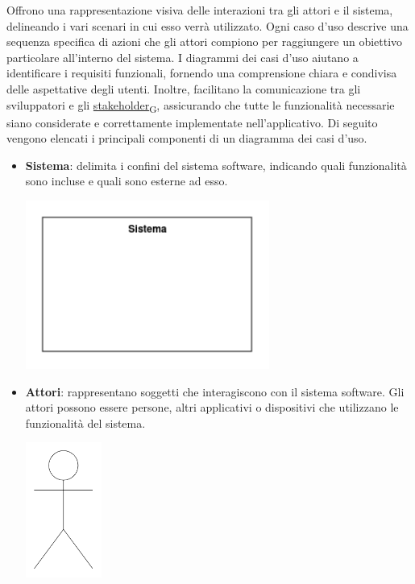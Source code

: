 Offrono una rappresentazione visiva delle interazioni tra gli attori e il sistema, delineando i vari scenari in cui esso verrà utilizzato. Ogni caso d'uso descrive una sequenza specifica di azioni che gli attori compiono per raggiungere un obiettivo particolare all'interno del sistema. I diagrammi dei casi d'uso aiutano a identificare i requisiti funzionali, fornendo una comprensione chiara e condivisa delle aspettative degli utenti. Inoltre, facilitano la comunicazione tra gli sviluppatori e gli \href{https://7last.github.io/docs/rtb/documentazione-interna/glossario\#stakeholder}{stakeholder\textsubscript{G}}, assicurando che tutte le funzionalità necessarie siano considerate e correttamente implementate nell'applicativo.
Di seguito vengono elencati i principali componenti di un diagramma dei casi d'uso.
\begin{itemize}
	\item \textbf{Sistema}: delimita i confini del sistema software, indicando quali funzionalità sono incluse e quali sono esterne ad esso.
	      \begin{center}
		      \includegraphics*[width=8cm]{../../../images/norme_di_progetto/sistema.png}
	      \end{center}
	\item \textbf{Attori}: rappresentano soggetti che interagiscono con il sistema software. Gli attori possono essere persone, altri applicativi o dispositivi che utilizzano le funzionalità del sistema.
	      \begin{center}
		      \includegraphics*[width=2.5cm]{../../../images/norme_di_progetto/attore.png}

\end{center}
\end{itemize}
